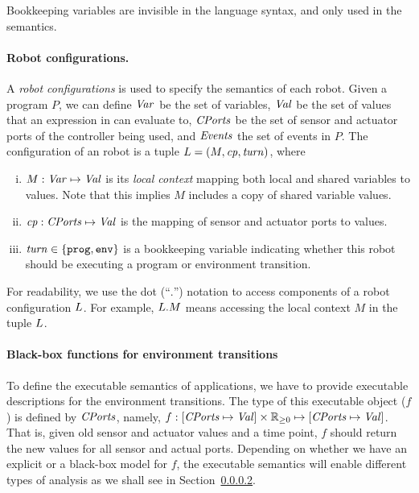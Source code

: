 Bookkeeping variables are invisible in the language syntax, and only used in the semantics.


\paragraph{Robot configurations.}

A \emph{robot configurations} is used to specify the semantics of each robot.
Given a \lgname program $P$, we can define $\mathit{Var}$ be the set of variables,
$\mathit{Val}$ be the set of values that an expression in \lgname can evaluate to,
$\mathit{CPorts}$ be the set of sensor and actuator ports of the controller being used,
and $\mathit{Events}$ the set of events in $P$.
%
%
The configuration of an robot is a tuple $L = ({M},\mathit{cp},\mathit{turn})$, where

\begin{enumerate}[(i)]
\item ${M} : \mathit{Var} \mapsto \mathit{Val}$ is its \emph{local context} mapping both local and shared variables to values.
      Note that this implies $M$ includes a copy of shared variable values.
\item $\mathit{cp} : \mathit{CPorts} \mapsto \mathit{Val}$ is the mapping of sensor and actuator ports to values.
\item $\mathit{turn} \in \{\mathtt{prog},\mathtt{env}\}$ is a bookkeeping variable indicating whether this robot should be executing a program or environment transition.
\end{enumerate}
For readability, we use the dot (``$.$'') notation to access components of a robot configuration $L$.
For example, $L.M$ means accessing the local context $M$ in the tuple $L$.

\paragraph{Black-box functions for environment transitions}
To define the  executable \K semantics of  \lgname applications, we have to provide executable descriptions for the environment transitions. The type of this executable object ($f$) is defined by $\mathit{CPorts}$, namely, 
$f: [\Cfield \mapsto \Val] \times \nnreals \mapsto [\Cfield \mapsto \Val]$.
That is, given old sensor and actuator values and a time point, $f$ should return the new values for all sensor and actual ports.
%
Depending on whether  we have an explicit or a black-box model for $f$, the executable semantics will enable different types of analysis as we shall see in Section~\ref{}.


